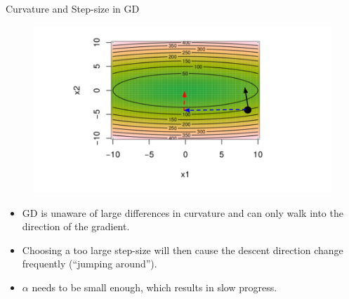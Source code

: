 \documentclass[11pt,compress,t,notes=noshow, xcolor=table]{beamer}
\begin{document}
\begin{vbframe}{Curvature and Step-size in GD}
	\vspace*{-0.4cm}
	
	\begin{figure}
		\begin{center}
			\includegraphics[width=.7\textwidth]{figure_man/curvature3.png}
		\end{center}
	\end{figure}
	
\framebreak 

\begin{itemize}

\item GD is unaware of large differences in curvature and can only walk into the direction of the gradient.  
\item Choosing a too large step-size will then cause the descent direction change frequently (\enquote{jumping around}).
\item $\alpha$ needs to be small enough, which results in slow progress.


\end{itemize}
\end{vbframe}
\end{document}
